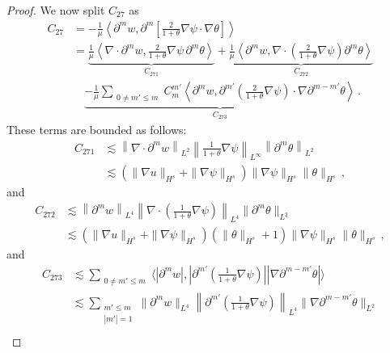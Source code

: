 \documentclass[reqno,11pt]{amsart}
\numberwithin{equation}{section}
\begin{document}
\begin{proof}
We now split $C_{27}$ as
\begin{align*}
C_{27}& = -\frac{1}{\mu} \left\langle \partial^m w, \partial^m \left[ \frac{2}{1+\theta} \nabla \psi \cdot \nabla \theta \right] \right\rangle \\&
= \underset{C_{271}}{\underbrace{\frac{1}{\mu} \left\langle \nabla \cdot \partial^m w, \frac{2}{1+\theta} \nabla \psi \, \partial^m \theta \right\rangle}} + \underset{C_{272}}{\underbrace{\frac{1}{\mu} \left\langle \partial^m w, \nabla \cdot \left( \frac{2}{1+\theta} \nabla \psi \right) \partial^m \theta \right\rangle}} \\&
\quad\underset{C_{273}}{\underbrace{- \frac{1}{\mu} \sum_{\substack{0 \neq m' \leq m}} C_m^{m'} \left\langle \partial^m w, \partial^{m'} \left( \frac{2}{1+\theta} \nabla \psi \right) \cdot \nabla \partial^{m-m'} \theta \right\rangle}} \,.
\end{align*}
These terms are bounded as follows:
\begin{equation*}
\begin{aligned}
C_{271}&\lesssim \left\| \nabla \cdot \partial^m w \right\|_{L^2} \left\| \frac{1}{1+\theta} \nabla \psi \right\|_{L^\infty} \left\| \partial^m \theta \right\|_{L^2} \\
&\lesssim (\|\nabla u\|_{H^s} + \|\nabla \psi\|_{H^s}) \|\nabla \psi\|_{H^s} \|\theta\|_{H^s} \,,
\end{aligned}
\end{equation*}
and
\begin{equation*}
\begin{aligned}
C_{272}&\lesssim \left\| \partial^m w \right\|_{L^4} \left\| \nabla \cdot \left(\frac{1}{1+\theta} \nabla \psi\right) \right\|_{L^4} \|\partial^m \theta\|_{L^2} \\
&\lesssim (\|\nabla u\|_{H^s} + \|\nabla \psi\|_{H^s}) (\|\theta\|_{H^s} + 1) \|\nabla \psi\|_{H^s} \|\theta\|_{H^s} \,,
\end{aligned}
\end{equation*}
and
\begin{equation*}
\begin{aligned}
C_{273}&\lesssim \sum_{\substack{0\neq m' \leq m }} \langle |\partial^m w|, |\partial^{m'} \left(\frac{1}{1+\theta} \nabla \psi\right)| |\nabla \partial^{m-m'} \theta| \rangle \\
&\lesssim \sum_{\substack{m' \leq m \\ |m'| =1}} \|\partial^m w\|_{L^4} \left\| \partial^{m'} \left(\frac{1}{1+\theta} \nabla \psi\right) \right\|_{L^4} \|\nabla \partial^{m-m'} \theta\|_{L^2} \\

\end{aligned}
\end{equation*}
\end{proof}
\end{document}

